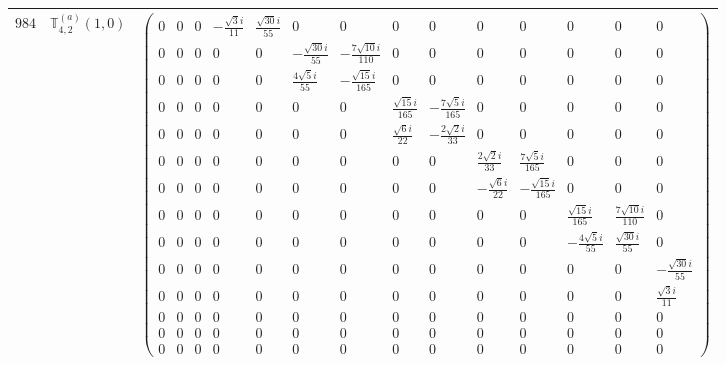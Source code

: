 \documentclass[fleqn,8pt,landscape]{jsarticle}
\begin{document}
\begin{center}
\begin{longtable}{ccc}
$ 984 $ & $ \mathbb{T}_{4,2}^{(a)}(1,0) $ & $ \begin{pmatrix} 0 & 0 & 0 & - \frac{\sqrt{3} i}{11} & \frac{\sqrt{30} i}{55} & 0 & 0 & 0 & 0 & 0 & 0 & 0 & 0 & 0 \\ 0 & 0 & 0 & 0 & 0 & - \frac{\sqrt{30} i}{55} & - \frac{7 \sqrt{10} i}{110} & 0 & 0 & 0 & 0 & 0 & 0 & 0 \\ 0 & 0 & 0 & 0 & 0 & \frac{4 \sqrt{5} i}{55} & - \frac{\sqrt{15} i}{165} & 0 & 0 & 0 & 0 & 0 & 0 & 0 \\ 0 & 0 & 0 & 0 & 0 & 0 & 0 & \frac{\sqrt{15} i}{165} & - \frac{7 \sqrt{5} i}{165} & 0 & 0 & 0 & 0 & 0 \\ 0 & 0 & 0 & 0 & 0 & 0 & 0 & \frac{\sqrt{6} i}{22} & - \frac{2 \sqrt{2} i}{33} & 0 & 0 & 0 & 0 & 0 \\ 0 & 0 & 0 & 0 & 0 & 0 & 0 & 0 & 0 & \frac{2 \sqrt{2} i}{33} & \frac{7 \sqrt{5} i}{165} & 0 & 0 & 0 \\ 0 & 0 & 0 & 0 & 0 & 0 & 0 & 0 & 0 & - \frac{\sqrt{6} i}{22} & - \frac{\sqrt{15} i}{165} & 0 & 0 & 0 \\ 0 & 0 & 0 & 0 & 0 & 0 & 0 & 0 & 0 & 0 & 0 & \frac{\sqrt{15} i}{165} & \frac{7 \sqrt{10} i}{110} & 0 \\ 0 & 0 & 0 & 0 & 0 & 0 & 0 & 0 & 0 & 0 & 0 & - \frac{4 \sqrt{5} i}{55} & \frac{\sqrt{30} i}{55} & 0 \\ 0 & 0 & 0 & 0 & 0 & 0 & 0 & 0 & 0 & 0 & 0 & 0 & 0 & - \frac{\sqrt{30} i}{55} \\ 0 & 0 & 0 & 0 & 0 & 0 & 0 & 0 & 0 & 0 & 0 & 0 & 0 & \frac{\sqrt{3} i}{11} \\ 0 & 0 & 0 & 0 & 0 & 0 & 0 & 0 & 0 & 0 & 0 & 0 & 0 & 0 \\ 0 & 0 & 0 & 0 & 0 & 0 & 0 & 0 & 0 & 0 & 0 & 0 & 0 & 0 \\ 0 & 0 & 0 & 0 & 0 & 0 & 0 & 0 & 0 & 0 & 0 & 0 & 0 & 0 \end{pmatrix} $ \\ \hline

\end{longtable}
\end{center}
\end{document}

